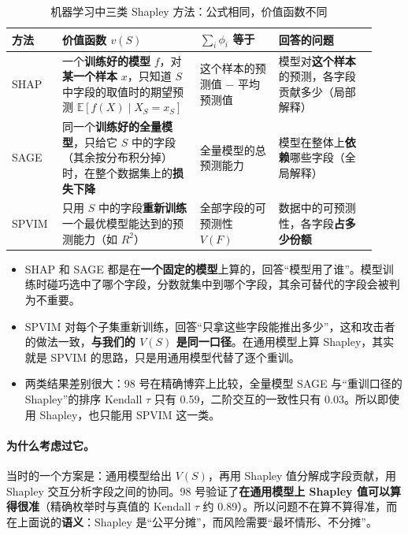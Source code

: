\documentclass[zihao=-4,a4paper]{ctexart}
\begin{document}
\begin{table}[H]\centering
\caption{机器学习中三类 Shapley 方法：公式相同，价值函数不同}
\footnotesize\setlength{\tabcolsep}{3pt}
\begin{tabular}{p{0.12\linewidth}p{0.35\linewidth}p{0.2\linewidth}p{0.25\linewidth}}
\toprule
方法 & 价值函数 $v(S)$ & $\sum_i\phi_i$ 等于 & 回答的问题 \\
\midrule
SHAP \cite{lundberg2017} & 一个\textbf{训练好的模型} $f$，对\textbf{某一个样本} $x$，只知道 $S$ 中字段的取值时的期望预测 $\mathbb E[f(X)\mid X_S=x_S]$ & 这个样本的预测值 $-$ 平均预测值 & 模型对\textbf{这个样本}的预测，各字段贡献多少（局部解释） \\
\addlinespace
SAGE \cite{covert2020} & 同一个\textbf{训练好的全量模型}，只给它 $S$ 中的字段（其余按分布积分掉）时，在整个数据集上的\textbf{损失下降} & 全量模型的总预测能力 & 模型在整体上\textbf{依赖}哪些字段（全局解释） \\
\addlinespace
SPVIM \cite{williamson2020} & 只用 $S$ 中的字段\textbf{重新训练}一个最优模型能达到的预测能力（如 $R^2$） & 全部字段的可预测性 $V(F)$ & 数据中的可预测性，各字段\textbf{占多少份额} \\
\bottomrule
\end{tabular}
\end{table}

\begin{itemize}[leftmargin=*]
  \item SHAP 和 SAGE 都是在\textbf{一个固定的模型}上算的，回答“模型用了谁”。模型训练时碰巧选中了哪个字段，分数就集中到哪个字段，其余可替代的字段会被判为不重要。
  \item SPVIM 对每个子集重新训练，回答“只拿这些字段能推出多少”，这和攻击者的做法一致，\textbf{与我们的 $V(S)$ 是同一口径}。在通用模型上算 Shapley，其实就是 SPVIM 的思路，只是用通用模型代替了逐个重训。
  \item 两类结果差别很大：98 号在精确博弈上比较，全量模型 SAGE 与“重训口径的 Shapley”的排序 Kendall $\tau$ 只有 0.59，二阶交互的一致性只有 0.03。所以即使用 Shapley，也只能用 SPVIM 这一类。
\end{itemize}

\paragraph{为什么考虑过它。}当时的一个方案是：通用模型给出 $V(S)$，再用 Shapley 值分解成字段贡献，用 Shapley 交互分析字段之间的协同。98 号验证了\textbf{在通用模型上 Shapley 值可以算得很准}（精确枚举时与真值的 Kendall $\tau$ 约 0.89）。所以问题不在算不算得准，而在上面说的\textbf{语义}：Shapley 是“公平分摊”，而风险需要“最坏情形、不分摊”。
\end{document}

